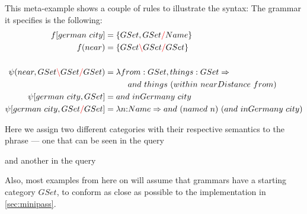 \documentclass[main.tex]{subfiles}
\begin{document}
\begin{example}
    This meta-example shows a couple of rules to illustrate the syntax:
    The grammar it specifies is the following:
    \begin{align*}
        f[german \text{ } city] &= \{ GSet, GSet \textcolor{red}{/} Name \} \\
        f(near) &= \{ GSet \textcolor{red}{\backslash} GSet \textcolor{red}{/} GSet \} \\
        \\
        \psi(near, GSet \textcolor{red}{\backslash} GSet \textcolor{red}{/} GSet) &= \lambda from: GSet, things: GSet \Rightarrow \\
        & \phantom{=} \qquad and \text{ } things \text{ } (within \text{ } nearDistance \text{ } from) \\
        \psi[german \text{ } city, GSet] &= and \text{ } inGermany \text{ } city \\
        \psi[german \text{ } city, GSet \textcolor{red}{/} GSet] &= \lambda n{:} Name \Rightarrow and \text{ } (named \text{ } n) \text{ } (and \text{ } inGermany \text{ } city) \\
    \end{align*}

    Here we assign two different categories with their respective semantics
    to the phrase  --- one that can be seen in the query
    \begin{center}
    \end{center}
    and another in the query
    \begin{center}
    \end{center}
\end{example}

Also, most examples from here on will assume that grammars have a starting
category $GSet$, to conform as close as possible to the implementation in
\cref{sec:minipass}.
\end{document}

